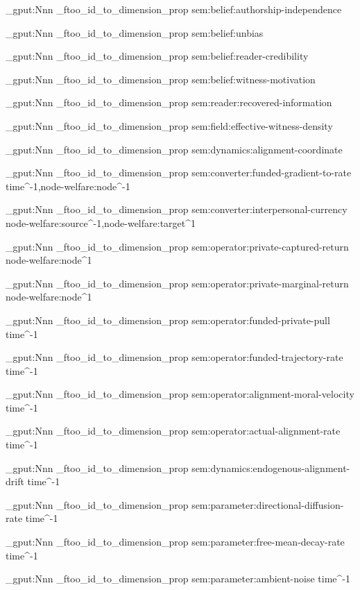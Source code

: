 \prop_gput:Nnn \g_ftoo_id_to_dimension_prop { sem:belief:authorship-independence } {  }

\prop_gput:Nnn \g_ftoo_id_to_dimension_prop { sem:belief:unbias } {  }

\prop_gput:Nnn \g_ftoo_id_to_dimension_prop { sem:belief:reader-credibility } {  }

\prop_gput:Nnn \g_ftoo_id_to_dimension_prop { sem:belief:witness-motivation } {  }

\prop_gput:Nnn \g_ftoo_id_to_dimension_prop { sem:reader:recovered-information } {  }

\prop_gput:Nnn \g_ftoo_id_to_dimension_prop { sem:field:effective-witness-density } {  }

\prop_gput:Nnn \g_ftoo_id_to_dimension_prop { sem:dynamics:alignment-coordinate } {  }

\prop_gput:Nnn \g_ftoo_id_to_dimension_prop { sem:converter:funded-gradient-to-rate } { time^-1,node-welfare:node^-1 }

\prop_gput:Nnn \g_ftoo_id_to_dimension_prop { sem:converter:interpersonal-currency } { node-welfare:source^-1,node-welfare:target^1 }

\prop_gput:Nnn \g_ftoo_id_to_dimension_prop { sem:operator:private-captured-return } { node-welfare:node^1 }

\prop_gput:Nnn \g_ftoo_id_to_dimension_prop { sem:operator:private-marginal-return } { node-welfare:node^1 }

\prop_gput:Nnn \g_ftoo_id_to_dimension_prop { sem:operator:funded-private-pull } { time^-1 }

\prop_gput:Nnn \g_ftoo_id_to_dimension_prop { sem:operator:funded-trajectory-rate } { time^-1 }

\prop_gput:Nnn \g_ftoo_id_to_dimension_prop { sem:operator:alignment-moral-velocity } { time^-1 }

\prop_gput:Nnn \g_ftoo_id_to_dimension_prop { sem:operator:actual-alignment-rate } { time^-1 }

\prop_gput:Nnn \g_ftoo_id_to_dimension_prop { sem:dynamics:endogenous-alignment-drift } { time^-1 }

\prop_gput:Nnn \g_ftoo_id_to_dimension_prop { sem:parameter:directional-diffusion-rate } { time^-1 }

\prop_gput:Nnn \g_ftoo_id_to_dimension_prop { sem:parameter:free-mean-decay-rate } { time^-1 }

\prop_gput:Nnn \g_ftoo_id_to_dimension_prop { sem:parameter:ambient-noise } { time^-1 }

